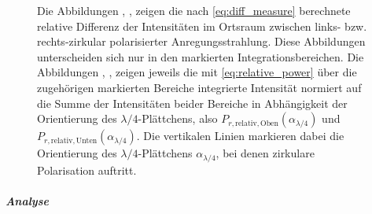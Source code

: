 \documentclass[titlepage,  ngerman]{article}
\begin{document}
\begin{figure}[h]
			\caption[Differenz- und Integrationsdaten PSHE Ortsraum]{Die Abbildungen , ,  zeigen die nach \eqref{eq:diff_measure} berechnete relative Differenz der Intensitäten im Ortsraum zwischen links- bzw. rechts-zirkular polarisierter Anregungsstrahlung. Diese Abbildungen unterscheiden sich nur in den markierten Integrationsbereichen. Die Abbildungen , ,  zeigen jeweils die mit \eqref{eq:relative_power} über die zugehörigen markierten Bereiche integrierte Intensität normiert auf die Summe der Intensitäten beider Bereiche in Abhängigkeit der Orientierung des $\lambda/4$-Plättchens, also $P_{r, \mathrm{relativ}, \mathrm{Oben}}(\alpha_{\lambda/4})$ und $P_{r, \mathrm{relativ}, \mathrm{Unten}}(\alpha_{\lambda/4})$. Die vertikalen Linien markieren dabei die Orientierung des $\lambda/4$-Plättchens $\alpha_{\lambda/4}$, bei denen zirkulare Polarisation auftritt.}
			\label{fig:spin_hall_measure_diff_fp}
		\end{figure}
		\subparagraph{Analyse}
\end{document}
